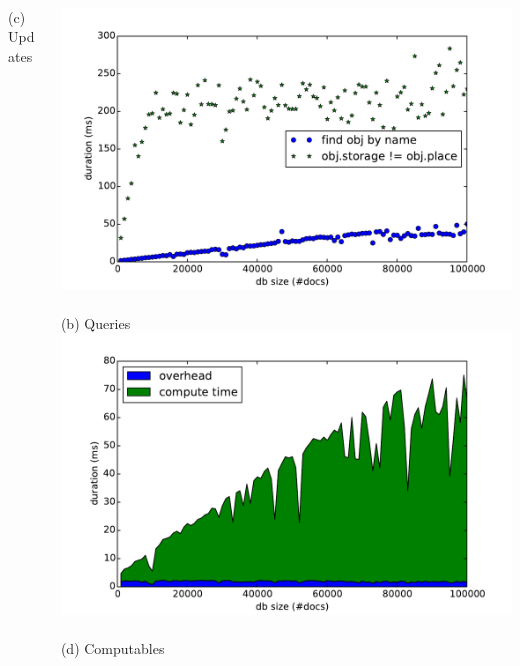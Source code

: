 \begin{frame}
\begin{columns}
\begin{column}{0.55\textwidth}
    \\\vspace{-0.05cm}
    (c) Updates
    \end{column}
    \begin{column}{0.55\textwidth}
  \centering
    \small
    \\\vspace{-0.15cm}
    \includegraphics[width=\textwidth]{../thesis/plots/query-durations}\\
    \\\vspace{-0.05cm}
    (b) Queries
    \\\vspace{-0.1cm}
    \includegraphics[width=\textwidth]{../thesis/plots/computable-durations}\\
    \\\vspace{-0.05cm}
    (d) Computables
    \end{column}
  \end{columns}
\end{frame}

